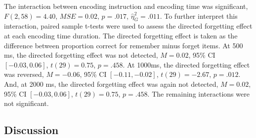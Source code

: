 \documentclass[
  english,
  man,floatsintext]{apa6}
\begin{document}
The interaction between encoding instruction and encoding time was significant, \(F(2, 58) = 4.40\), \(\mathit{MSE} = 0.02\), \(p = .017\), \(\hat{\eta}^2_G = .011\). To further interpret this interaction, paired sample t-tests were used to assess the directed forgetting effect at each encoding time duration. The directed forgetting effect is taken as the difference between proportion correct for remember minus forget items. At 500 ms, the directed forgetting effect was not detected, \(M = 0.02\), 95\% CI \([-0.03, 0.06]\), \(t(29) = 0.75\), \(p = .458\). At 1000ms, the directed forgetting effect was reversed, \(M = -0.06\), 95\% CI \([-0.11, -0.02]\), \(t(29) = -2.67\), \(p = .012\). And, at 2000 ms, the directed forgetting effect was again not detected, \(M = 0.02\), 95\% CI \([-0.03, 0.06]\), \(t(29) = 0.75\), \(p = .458\). The remaining interactions were not significant.

\hypertarget{discussion}{%
\subsection{Discussion}\label{discussion}}
\end{document}
